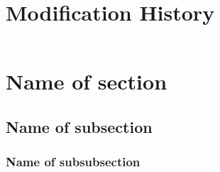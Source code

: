 \documentclass{template/openetcs_article}
\begin{document}



\begin{abstract}
  \lipsum[12-13]
\end{abstract}

\maketitle

\section*{Modification History}
\begin{supertabular}{| m{1.2cm} | m{1.2cm} | m{6.6cm} | m{4cm} |}
 & & & \\\hline
\end{supertabular}


\tableofcontents
\listoffiguresandtables
\newpage















\section{Name of section}
\subsection{Name of subsection}
\subsubsection{Name of subsubsection}
\end{document}
